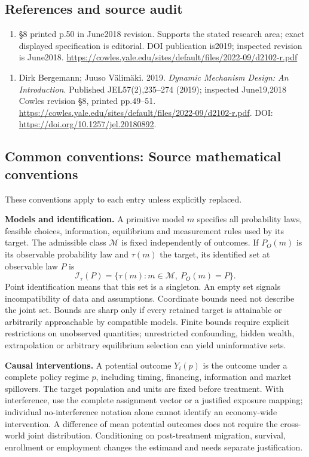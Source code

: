 \documentclass[11pt,a4paper]{article}
\begin{document}
\subsection*{References and source audit}
\begin{enumerate}
\item §8 printed p.50 in June2018 revision. Supports the stated research area; exact displayed specification is editorial. DOI publication is2019; inspected revision is June2018. \url{https://cowles.yale.edu/sites/default/files/2022-09/d2102-r.pdf}
\end{enumerate}
\begin{enumerate}\raggedright
\item\hypertarget{definitions:source:30007573:1}{} Dirk Bergemann; Juuso Välimäki. 2019. \emph{Dynamic Mechanism Design: An Introduction}. Published JEL57(2),235–274 (2019); inspected June19,2018 Cowles revision §8, printed pp.49–51.
\url{https://cowles.yale.edu/sites/default/files/2022-09/d2102-r.pdf}.
DOI: \url{https://doi.org/10.1257/jel.20180892}.
\end{enumerate}

\subsection*{Common conventions: Source mathematical conventions}

These conventions apply to each entry unless explicitly replaced.

\textbf{Models and identification.} A primitive model \(m\) specifies all probability laws, feasible choices, information, equilibrium and measurement rules used by its target. The admissible class \(\mathcal M\) is fixed independently of outcomes. If \(P_O(m)\) is its observable probability law and \(\tau(m)\) the target, its identified set at observable law \(P\) is
\[
 \mathcal I_\tau(P)=\{\tau(m):m\in\mathcal M,\ P_O(m)=P\}.
\]
Point identification means that this set is a singleton. An empty set signals incompatibility of data and assumptions. Coordinate bounds need not describe the joint set. Bounds are sharp only if every retained target is attainable or arbitrarily approachable by compatible models. Finite bounds require explicit restrictions on unobserved quantities; unrestricted confounding, hidden wealth, extrapolation or arbitrary equilibrium selection can yield uninformative sets.

\textbf{Causal interventions.} A potential outcome \(Y_i(p)\) is the outcome under a complete policy regime \(p\), including timing, financing, information and market spillovers. The target population and units are fixed before treatment. With interference, use the complete assignment vector or a justified exposure mapping; individual no-interference notation alone cannot identify an economy-wide intervention. A difference of mean potential outcomes does not require the cross-world joint distribution. Conditioning on post-treatment migration, survival, enrollment or employment changes the estimand and needs separate justification.
\end{document}
